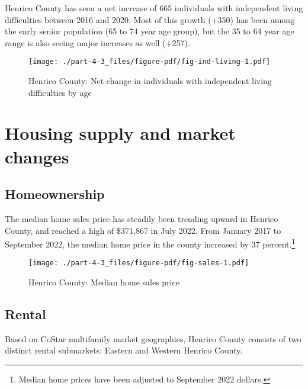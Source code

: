 \documentclass[
  letterpaper,
  DIV=11,
  numbers=noendperiod]{scrreprt}
\begin{document}
Henrico County has seen a net increase of 665 individuals with
independent living difficulties between 2016 and 2020. Most of this
growth (+350) has been among the early senior population (65 to 74 year
age group), but the 35 to 64 year age range is also seeing major
increases as well (+257).

\begin{figure}

{\centering \texttt{[image: ./part-4-3\_files/figure-pdf/fig-ind-living-1.pdf]}

}

\caption{\label{fig-ind-living}Henrico County: Net change in individuals
with independent living difficulties by age}

\end{figure}

\hypertarget{housing-supply-and-market-changes-2}{%
\section{Housing supply and market
changes}\label{housing-supply-and-market-changes-2}}

\hypertarget{homeownership-2}{%
\subsection{Homeownership}\label{homeownership-2}}

The median home sales price has steadily been trending upward in Henrico
County, and reached a high of \$371,867 in July 2022. From January 2017
to September 2022, the median home price in the county increased by 37
percent.\footnote{Median home prices have been adjusted to September
  2022 dollars.}

\begin{figure}

{\centering \texttt{[image: ./part-4-3\_files/figure-pdf/fig-sales-1.pdf]}

}

\caption{\label{fig-sales}Henrico County: Median home sales price}

\end{figure}

\hypertarget{rental-2}{%
\subsection{Rental}\label{rental-2}}

Based on CoStar multifamily market geographies, Henrico County consists
of two distinct rental submarkets: Eastern and Western Henrico County.
\end{document}
